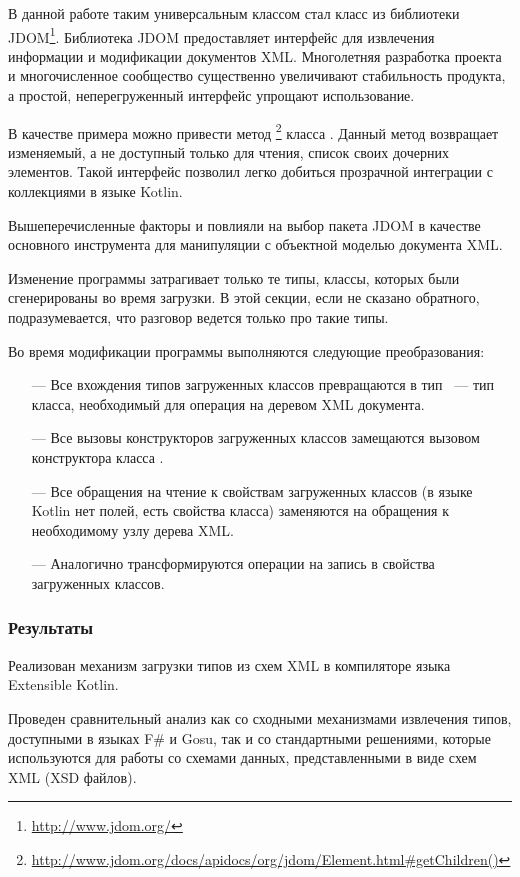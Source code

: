В данной работе таким универсальным классом стал класс  из библиотеки JDOM\footnote{\url{http://www.jdom.org/}}. Библиотека JDOM предоставляет интерфейс для извлечения информации и модификации документов XML. Многолетняя разработка проекта и многочисленное сообщество существенно увеличивают стабильность продукта, а простой, неперегруженный интерфейс упрощают использование.

В качестве примера можно привести метод \footnote{\url{http://www.jdom.org/docs/apidocs/org/jdom/Element.html\#getChildren()}} класса .
Данный метод возвращает изменяемый, а не доступный только для чтения, список своих дочерних элементов. Такой интерфейс позволил легко добиться прозрачной интеграции с коллекциями в языке Kotlin.

Вышеперечисленные факторы и повлияли на выбор пакета JDOM в качестве основного инструмента для манипуляции с объектной моделью документа XML.

Изменение программы затрагивает только те типы, классы, которых были сгенерированы во время загрузки. В этой секции, если не сказано обратного, подразумевается, что разговор ведется только про такие типы.

Во время модификации программы выполняются следующие преобразования:
\begin{itemize}
\item[---] Все вхождения типов загруженных классов превращаются в тип ~--- тип класса, необходимый для операция на деревом XML документа.
\item[---] Все вызовы конструкторов загруженных классов замещаются вызовом конструктора класса .
\item[---] Все обращения на чтение к свойствам загруженных классов (в языке Kotlin нет полей, есть свойства класса) заменяются на обращения к необходимому узлу дерева XML.
\item[---] Аналогично трансформируются операции на запись в свойства загруженных классов.
\end{itemize}

\subsubsection{Результаты}
Реализован механизм загрузки типов из схем XML в компиляторе языка Extensible Kotlin.

Проведен сравнительный анализ как со сходными механизмами извлечения типов, доступными в языках F\# и Gosu, так и со стандартными решениями, которые используются для работы со схемами данных, представленными в виде схем XML (XSD файлов).